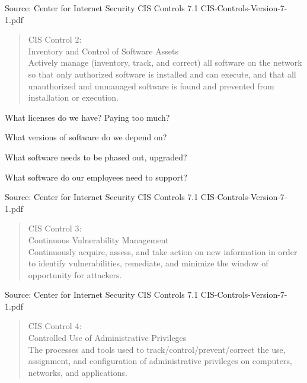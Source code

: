 \documentclass[Screen16to9,17pt]{foils}
\begin{document}
Source: Center for Internet Security CIS Controls 7.1 CIS-Controls-Version-7-1.pdf



\begin{quote}
CIS Control 2:\\
Inventory and Control of Software Assets\\
Actively manage (inventory, track, and correct) all software on the network so that only authorized software is installed and can execute, and that all unauthorized and unmanaged software is found and prevented from installation or execution.
\end{quote}

\begin{list1}
\item What licenses do we have? Paying too much?
\item What versions of software do we depend on?
\item What software needs to be phased out, upgraded?
\item What software do our employees need to support?
\end{list1}

Source: Center for Internet Security CIS Controls 7.1 CIS-Controls-Version-7-1.pdf



\begin{quote}
CIS Control 3:\\
Continuous Vulnerability Management\\
Continuously acquire, assess, and take action on new information in order to identify vulnerabilities, remediate, and minimize the window of opportunity for attackers.
\end{quote}

\begin{list1}
\item
\item
\item
\item
\end{list1}

Source: Center for Internet Security CIS Controls 7.1 CIS-Controls-Version-7-1.pdf


\begin{quote}
CIS Control 4:\\
Controlled Use of Administrative Privileges\\
The processes and tools used to track/control/prevent/correct the use, assignment, and configuration of administrative privileges on computers, networks, and applications.
\end{quote}
\end{document}
